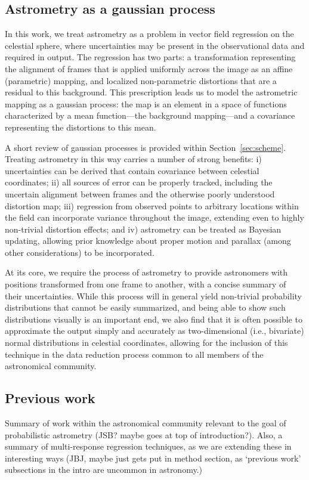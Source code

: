 \documentclass[manuscript]{aastex}
\begin{document}
\subsection{Astrometry as a gaussian process}
In this work, we treat astrometry as a problem in vector field regression on the celestial sphere, where uncertainties may be present in the observational data and required in output. The regression has two parts: a transformation representing the alignment of frames that is applied uniformly across the image as an affine (parametric) mapping, and localized non-parametric distortions that are a residual to this background. This prescription leads us to model the astrometric mapping as a gaussian process: the map is an element in a space of functions characterized by a mean function---the background mapping---and a covariance representing the distortions to this mean. 

A short review of gaussian processes is provided within Section~\ref{sec:scheme}. Treating astrometry in this way carries a number of strong benefits: i) uncertainties can be derived that contain covariance between celestial coordinates; ii) all sources of error can be properly tracked, including the uncertain alignment between frames and the otherwise poorly understood distortion map; iii) regression from observed points to arbitrary locations within the field can incorporate variance throughout the image, extending even to highly non-trivial distortion effects; and iv) astrometry can be treated as Bayesian updating, allowing prior knowledge about proper motion and parallax (among other considerations) to be incorporated.

At its core, we require the process of astrometry to provide astronomers with positions transformed from one frame to another, with a concise summary of their uncertainties. While this process will in general yield non-trivial probability distributions that cannot be easily summarized, and being able to show such distributions visually is an important end, we also find that it is often possible to approximate the output simply and accurately as two-dimensional (i.e., bivariate) normal distributions in celestial coordinates, allowing for the inclusion of this technique in the data reduction process common to all members of the astronomical community.

\subsection{Previous work}
Summary of work within the astronomical community relevant to the goal of probabilistic astrometry (JSB? maybe goes at top of introduction?). Also, a summary of multi-response regression techniques, as we are extending these in interesting ways (JBJ, maybe just gets put in method section, as `previous work' subsections in the intro are uncommon in astronomy.)
\end{document}
